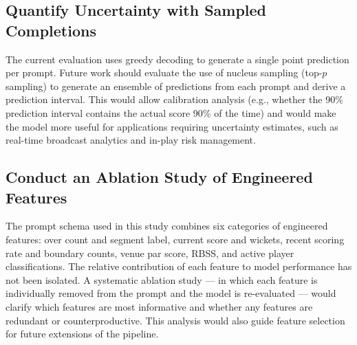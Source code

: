 \subsection{Quantify Uncertainty with Sampled Completions}

The current evaluation uses greedy decoding to generate a single point prediction per prompt. Future work should evaluate the use of nucleus sampling (top-$p$ sampling) to generate an ensemble of predictions from each prompt and derive a prediction interval. This would allow calibration analysis (e.g., whether the 90\% prediction interval contains the actual score 90\% of the time) and would make the model more useful for applications requiring uncertainty estimates, such as real-time broadcast analytics and in-play risk management.

\subsection{Conduct an Ablation Study of Engineered Features}

The prompt schema used in this study combines six categories of engineered features: over count and segment label, current score and wickets, recent scoring rate and boundary counts, venue par score, RBSS, and active player classifications. The relative contribution of each feature to model performance has not been isolated. A systematic ablation study --- in which each feature is individually removed from the prompt and the model is re-evaluated --- would clarify which features are most informative and whether any features are redundant or counterproductive. This analysis would also guide feature selection for future extensions of the pipeline.
